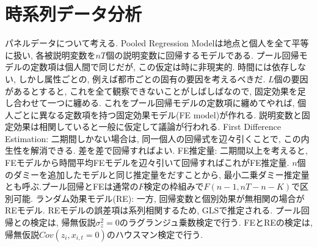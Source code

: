 \documentclass[paper=a4paper,fontsize=10pt]{jlreq}
\begin{document}
\section{時系列データ分析}
パネルデータについて考える. Pooled Regression Modelは地点と個人を全て平等に扱い, 各被説明変数を$nT$個の説明変数に回帰するモデルである. プール回帰モデルの定数項は個人間で同じだが, この仮定は時に非現実的. 時間には依存しない, しかし属性ごとの, 例えば都市ごとの固有の要因を考えるべきだ. $L$個の要因があるとすると, これを全て観察できないことがしばしばなので, 固定効果を足し合わせて一つに纏める. これをプール回帰モデルの定数項に纏めてやれば, 個人ごとに異なる定数項を持つ固定効果モデル(FE model)が作れる. 説明変数と固定効果は相関していると一般に仮定して議論が行われる. First Difference Estimation: 二期間しかない場合は, 同一個人の回帰式を辺々引くことで, この内生性を解消できる. 差を差で回帰すればよい. FE推定量: 二期間以上を考えると, FEモデルから時間平均FEモデルを辺々引いて回帰すればこれがFE推定量. $n$個のダミーを追加したモデルと同じ推定量をだすことから, 最小二乗ダミー推定量とも呼ぶ.プール回帰とFEは通常の$F$検定の枠組みで$F(n - 1, nT - n - K)$で区別可能. ランダム効果モデル(RE): 一方, 回帰変数と個別効果が無相関の場合がREモデル. REモデルの誤差項は系列相関するため, GLSで推定される. プール回帰との検定は, 帰無仮説$\sigma_z^2=0$のラグランジュ乗数検定で行う. FEとREの検定は, 帰無仮説$Cov(z_i, x_{i,t}=0)$のハウスマン検定で行う.\\
\end{document}
